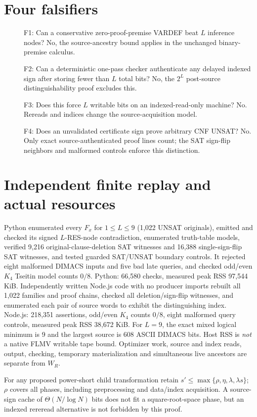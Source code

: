 \documentclass[11pt]{article}
\begin{document}
\section*{Four falsifiers}
\begin{description}
\item[] F1: Can a conservative zero-proof-premise VARDEF beat $L$ inference nodes? No, the source-ancestry bound applies in the unchanged binary-premise calculus.
\item[] F2: Can a deterministic one-pass checker authenticate any delayed indexed sign after storing fewer than $L$ total bits? No, the $2^L$ post-source distinguishability proof excludes this.
\item[] F3: Does this force $L$ writable bits on an indexed-read-only machine? No. Rereads and indices change the source-acquisition model.
\item[] F4: Does an unvalidated certificate sign prove arbitrary CNF UNSAT? No. Only exact source-authenticated proof lines count; the SAT sign-flip neighbors and malformed controls enforce this distinction.
\end{description}

\section*{Independent finite replay and actual resources}
Python enumerated every $F_x$ for $1\le L\le9$ (1,022 UNSAT originals), emitted and checked its signed $L$-RES-node contradiction, enumerated truth-table models, verified 9,216 original-clause-deletion SAT witnesses and 16,388 single-sign-flip SAT witnesses, and tested guarded SAT/UNSAT boundary controls. It rejected eight malformed DIMACS inputs and five bad late queries, and checked odd/even $K_4$ Tseitin model counts $0/8$. Python: 66,580 checks, measured peak RSS 97,544 KiB.
Independently written Node.js code with no producer imports rebuilt all 1,022 families and proof chains, checked all deletion/sign-flip witnesses, and enumerated each pair of source words to exhibit the distinguishing index. Node.js: 218,351 assertions, odd/even $K_4$ counts $0/8$, eight malformed query controls, measured peak RSS 38,672 KiB. For $L=9$, the exact mixed logical minimum is 9 and the largest source is 608 ASCII DIMACS bits. Host RSS is \emph{not} a native FLMV writable tape bound. Optimizer work, source and index reads, output, checking, temporary materialization and simultaneous live ancestors are separate from $W_R$.

For any proposed power-short child transformation retain $s'\le\max\{\rho,\eta,\lambda,\lambda s\}$; $\rho$ covers all phases, including preprocessing and data/index acquisition. A source-sign cache of $\Theta(N/\log N)$ bits does not fit a square-root-space phase, but an indexed rereread alternative is not forbidden by this proof.
\end{document}
